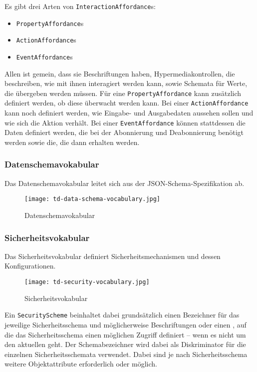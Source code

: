 Es gibt drei Arten von \lstinline{InteractionAffordance}s:

\begin{itemize}
  \item \lstinline{PropertyAffordance}s
  \item \lstinline{ActionAffordance}s
  \item \lstinline{EventAffordance}s
\end{itemize}

Allen ist gemein, dass sie Beschriftungen haben, Hypermediakontrollen, die beschreiben, wie mit ihnen interagiert werden kann, sowie Schemata für Werte, die übergeben werden müssen. Für eine \lstinline{PropertyAffordance} kann zusätzlich definiert werden, ob diese überwacht werden kann. Bei einer \lstinline{ActionAffordance} kann noch definiert werden, wie Eingabe- und Ausgabedaten aussehen sollen und wie sich die Aktion verhält. Bei einer \lstinline{EventAffordance} können stattdessen die Daten definiert werden, die bei der Abonnierung und Deabonnierung benötigt werden sowie die, die dann erhalten werden.

\subsubsection{Datenschemavokabular}

Das Datenschemavokabular leitet sich aus der JSON-Schema-Spezifikation \autocite{jsonschema} ab.

\begin{figure}[H]
  \centering
  \texttt{[image: td-data-schema-vocabulary.jpg]}
  \caption{ Datenschemavokabular}\label{fig:td_data_schema_vocabulary}
\end{figure}

\subsubsection{Sicherheitsvokabular}

Das Sicherheitsvokabular definiert Sicherheitsmechanismen und dessen Konfigurationen.

\begin{figure}[H]
  \centering
  \texttt{[image: td-security-vocabulary.jpg]}
  \caption{ Sicherheitsvokabular}\label{fig:td_security_vocabulary}
\end{figure}

Ein \lstinline{SecurityScheme} beinhaltet dabei grundsätzlich einen Bezeichner für das jeweilige Sicherheitsschema und möglicherweise Beschriftungen oder einen , auf die das Sicherheitsschema einen möglichen Zugriff definiert -- wenn es nicht um den aktuellen  geht. Der Schemabezeichner wird dabei als Diskriminator für die einzelnen Sicherheitsschemata verwendet. Dabei sind je nach Sicherheitsschema weitere Objektattribute erforderlich oder möglich.

